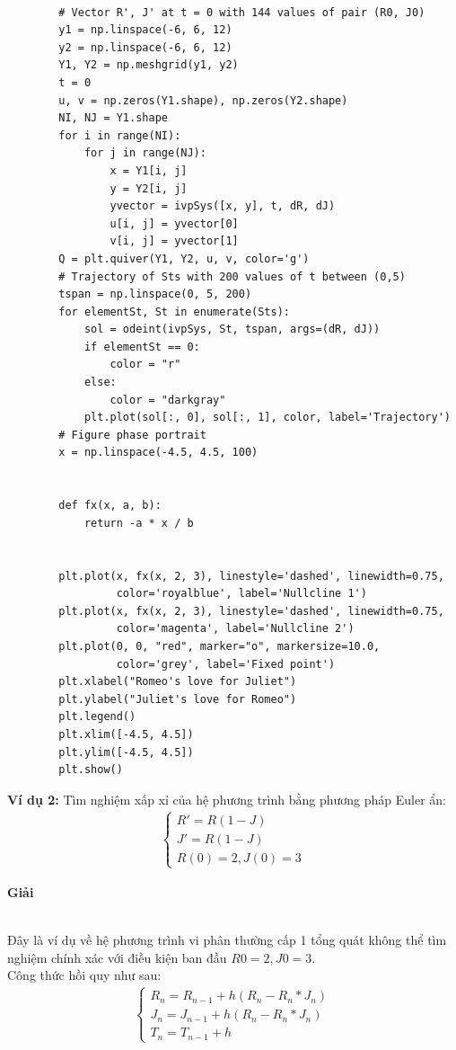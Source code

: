 \begin{enumerate}
\begin{lstlisting}
        
        # Vector R', J' at t = 0 with 144 values of pair (R0, J0)
        y1 = np.linspace(-6, 6, 12)
        y2 = np.linspace(-6, 6, 12)
        Y1, Y2 = np.meshgrid(y1, y2)
        t = 0
        u, v = np.zeros(Y1.shape), np.zeros(Y2.shape)
        NI, NJ = Y1.shape
        for i in range(NI):
            for j in range(NJ):
                x = Y1[i, j]
                y = Y2[i, j]
                yvector = ivpSys([x, y], t, dR, dJ)
                u[i, j] = yvector[0]
                v[i, j] = yvector[1]
        Q = plt.quiver(Y1, Y2, u, v, color='g')
        # Trajectory of Sts with 200 values of t between (0,5)
        tspan = np.linspace(0, 5, 200)
        for elementSt, St in enumerate(Sts):
            sol = odeint(ivpSys, St, tspan, args=(dR, dJ))
            if elementSt == 0:
                color = "r"
            else:
                color = "darkgray"
            plt.plot(sol[:, 0], sol[:, 1], color, label='Trajectory')
        # Figure phase portrait
        x = np.linspace(-4.5, 4.5, 100)
        
        
        def fx(x, a, b):
            return -a * x / b
        
        
        plt.plot(x, fx(x, 2, 3), linestyle='dashed', linewidth=0.75,
                 color='royalblue', label='Nullcline 1')
        plt.plot(x, fx(x, 2, 3), linestyle='dashed', linewidth=0.75,
                 color='magenta', label='Nullcline 2')
        plt.plot(0, 0, "red", marker="o", markersize=10.0,
                 color='grey', label='Fixed point')
        plt.xlabel("Romeo's love for Juliet")
        plt.ylabel("Juliet's love for Romeo")
        plt.legend()
        plt.xlim([-4.5, 4.5])
        plt.ylim([-4.5, 4.5])
        plt.show()
    \end{lstlisting}
\end{enumerate}
\textbf{Ví dụ 2:}  Tìm nghiệm xấp xỉ của hệ phương trình bằng phương pháp Euler ẩn:
\begin{align*}
    \begin{cases}
        R'=R(1 - J) \\
        J'=R(1 - J) \\
        R(0)=2, J(0)=3
    \end{cases}
\end{align*}
\centerline{\textbf{Giải}}\\
Đây là ví dụ về hệ phương trình vi phân thường cấp 1 tổng quát không thể tìm nghiệm chính xác với điều kiện ban đầu $R0=2, J0=3$.\\
Công thức hồi quy như sau:
\begin{align*}
    \begin{cases}
        R_n=R_{n-1}+h(R_n - R_n * J_n)\\
        J_n=J_{n-1}+h(R_n - R_n * J_n)\\
        T_n=T_{n-1}+h
    \end{cases}
\end{align*}
